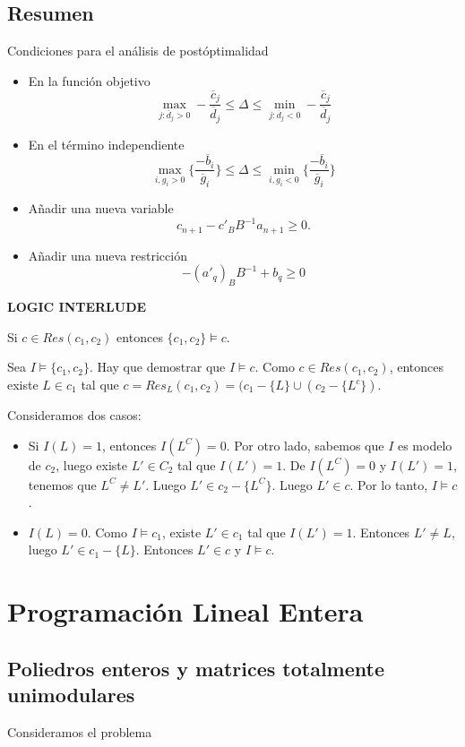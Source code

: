 \documentclass[PM.tex]{subfiles}
\begin{document}
\section{Resumen}
Condiciones para el análisis de postóptimalidad
\begin{itemize}
\item En la función objetivo
\[
\max_{j:\overline{d}_j >0}-\frac{\overline{c}_j}{\overline{d}_j} \leq \Delta \leq \min_{j:\overline{d}_j <0}-\frac{\overline{c}_j}{\overline{d}_j}
\]
\item En el término independiente
\[\max_{i, g_i>0}\{\frac{-\overline{b}_i}{\overline{g}_i}\}\leq\Delta \leq \min_{i,g_i<0}\{\frac{-\overline{b}_i}{\overline{g}_i}\}\]
\item Añadir una nueva variable
\[c_{n+1}-c'_B B^{-1} a_{n+1}\geq 0.\]
\item Añadir una nueva restricción
\[-(a'_q)_B B^{-1}+b_q\geq 0\]
\end{itemize}
{\large\bf LOGIC INTERLUDE}
\begin{theorem}
Si $c \in Res(c_1,c_2)$ entonces $\{ c_1, c_2 \} \models c$.
\end{theorem}

\begin{dem}

Sea $I \models \{ c_1, c_2\}$. Hay que demostrar que $I \models c$. Como $c \in Res(c_1,c_2)$, entonces existe $L \in c_1$ tal que $c = Res_L(c_1, c_2) = (c_1-\{ L \} \cup (c_2 - \{ L^c \})$.

Consideramos dos casos:
\begin{itemize}
	\item Si $I(L) = 1$, entonces $I(L^C)=0$. Por otro lado, sabemos que $I$ es modelo de $c_2$, luego existe $L' \in C_2$ tal que $I(L')=1$. De $I(L^C)=0$ y $I(L')=1$, tenemos que $L^C \neq L'$. Luego $L' \in c_2 - \{ L ^C \}$. Luego $L' \in c$. Por lo tanto, $I \models c$.
	\item $I(L) = 0$. Como $I \models c_1$, existe $L' \in c_1$ tal que $I(L') = 1$. Entonces $L' \neq L$, luego $L' \in c_1 - \{ L \}$. Entonces $L' \in c$ y $I \models c$. 
\end{itemize}
\end{dem}

\chapter{Programación Lineal Entera}

\section{Poliedros enteros y matrices totalmente unimodulares}
Consideramos el problema
\end{document}
